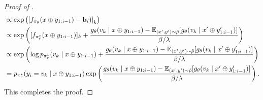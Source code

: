 \begin{proof}[Proof of ]
\begin{align*}
&\propto  \exp\left( \left[ f_{\pi_\theta}(x \oplus y_{1:i-1}) - \mathbf{b}_{i})\right]_k\right) \\
&\propto \exp\left( [ f_{\pi_r^*}(x \oplus y_{1:i-1})]_k + \frac{g_\theta(v_k \mid x \oplus y_{1:i-1}) - \mathbb{E}_{(x', y') \sim \tilde{\rho}}[g_\theta(v_k \mid x' \oplus y_{1:i-1}')]}{\beta / \lambda}\right)  \\
&\propto \exp\left( \log p_{\pi_{r}^*}(v_k \mid x\oplus y_{1:i-1}) + \frac{g_\theta(v_k \mid x \oplus y_{1:i-1}) - \mathbb{E}_{(x', y') \sim \tilde{\rho}}[g_\theta(v_k \mid x' \oplus y_{1:i-1}')]}{\beta / \lambda} \right)  \\
&= p_{\pi_{r}^*}(y_i = v_k \mid x\oplus y_{1:i-1}) \exp\left( \frac{g_\theta(v_k \mid x \oplus y_{1:i-1}) - \mathbb{E}_{(x', y') \sim \tilde{\rho}}[g_\theta(v_k \mid x' \oplus y_{1:i-1}')]}{\beta / \lambda} \right)  .
\end{align*}
This completes the proof.
\end{proof}

\clearpage